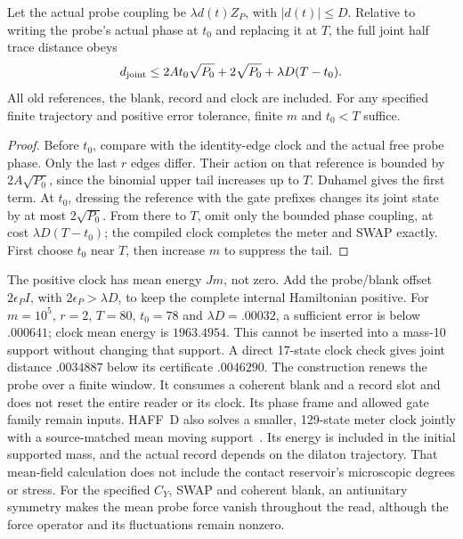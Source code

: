 \begin{proposition}
\label{prop:terminal-meter}
Let the actual probe coupling be $\lambda d(t)Z_P$, with
$|d(t)|\le D$. Relative to writing the probe's actual phase at $t_0$
and replacing it at $T$, the full joint half trace distance obeys
\begin{equation}\label{eq:terminal-meter-bound}
 d_{\rm joint}\le
  2At_0\sqrt{P_0}+2\sqrt{P_0}+\lambda D(T-t_0).
\end{equation}
All old references, the blank, record and clock are included.
For any specified finite trajectory and positive error tolerance,
finite $m$ and $t_0<T$ suffice.
\end{proposition}
\begin{proof}
Before $t_0$, compare with the identity-edge clock and the actual free
probe phase. Only the last $r$ edges differ. Their action on that
reference is bounded by $2A\sqrt{P_0}$, since the binomial upper tail
increases up to $T$. Duhamel gives the first term. At $t_0$, dressing
the reference with the gate prefixes changes its joint state by at
most $2\sqrt{P_0}$. From there to $T$, omit only the bounded phase
coupling, at cost $\lambda D(T-t_0)$; the compiled clock completes
the meter and SWAP exactly. First choose $t_0$ near $T$, then increase
$m$ to suppress the tail.
\end{proof}

The positive clock has mean energy $Jm$, not zero. Add the probe/blank
offset $2\epsilon_P I$, with $2\epsilon_P>\lambda D$, to keep the
complete internal Hamiltonian positive. For $m=10^5$, $r=2$, $T=80$,
$t_0=78$ and $\lambda D=.00032$, a sufficient error is below $.000641$;
clock mean energy is $1963.4954$. This cannot be inserted into a
mass-10 support without changing that support. A direct 17-state clock
check gives joint distance $.0034887$ below its certificate $.0046290$.
The construction renews the probe over a finite window. It consumes a
coherent blank and a record slot and does not reset the entire reader
or its clock. Its phase frame and allowed gate family remain inputs.
HAFF~D also solves a smaller, 129-state meter clock jointly with a
source-matched mean moving support~\cite{Liu2026HAFFD}. Its energy is
included in the initial supported mass, and the actual record depends
on the dilaton trajectory. That mean-field calculation does not include
the contact reservoir's microscopic degrees or stress. For the specified
$C_Y$, SWAP and coherent blank, an antiunitary symmetry makes the mean
probe force vanish throughout the read, although the force operator
and its fluctuations remain nonzero.

